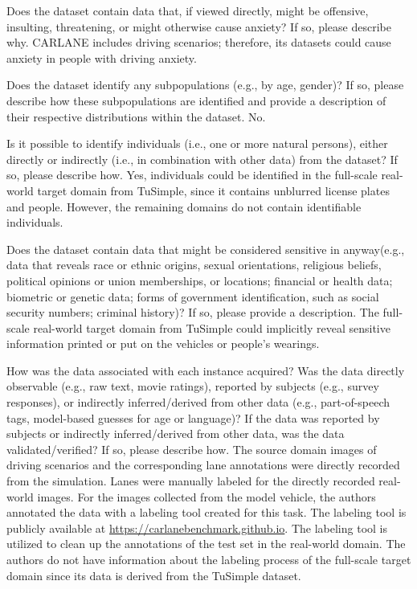 \documentclass{article}
\begin{document}
	\begin{datasheetitem}{Does the dataset contain data that, if viewed directly, might be offensive, insulting, threatening, or might otherwise cause anxiety? \normalfont If so, please describe why.}
		CARLANE includes driving scenarios; therefore, its datasets could cause anxiety in people with driving anxiety.
	\end{datasheetitem}
\begin{datasheetitem}{Does the dataset identify any subpopulations (e.g., by age, gender)? \normalfont If so, please describe how these subpopulations are identified and provide a description of their respective distributions within the dataset.}
		No.
	\end{datasheetitem}
	\begin{datasheetitem}{Is it possible to identify individuals (i.e., one or more natural persons), either directly or indirectly (i.e., in combination with other data) from the dataset? \normalfont If so, please describe how.}
		Yes, individuals could be identified in the full-scale real-world target domain from TuSimple, since it contains unblurred license plates and people. However, the remaining domains do not contain identifiable individuals. 
	\end{datasheetitem}
	\begin{datasheetitem}{Does the dataset contain data that might be considered sensitive in anyway(e.g., data that reveals race or ethnic origins, sexual orientations, religious beliefs, political opinions or union memberships, or locations; financial or health data; biometric or genetic data; forms of government identification, such as social security numbers; criminal history)? \normalfont If so, please provide a description.}
		The full-scale real-world target domain from TuSimple could implicitly reveal sensitive information printed or put on the vehicles or people's wearings.
	\end{datasheetitem}
	\begin{datasheetitem}{How was the data associated with each instance acquired? \normalfont Was the data directly observable (e.g., raw text, movie ratings), reported by subjects (e.g., survey responses), or indirectly inferred/derived from other data (e.g., part-of-speech tags, model-based guesses for age or language)? If the data was reported by subjects or indirectly inferred/derived from other data, was the data validated/verified? If so, please describe how.}
		The source domain images of driving scenarios and the corresponding lane annotations were directly recorded from the simulation. Lanes were manually labeled for the directly recorded real-world images. For the images collected from the model vehicle, the authors annotated the data with a labeling tool created for this task. The labeling tool is publicly available at \url{https://carlanebenchmark.github.io}. The labeling tool is utilized to clean up the annotations of the test set in the real-world domain. The authors do not have information about the labeling process of the full-scale target domain since its data is derived from the TuSimple dataset.
	\end{datasheetitem}
\end{document}
